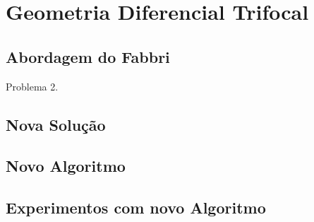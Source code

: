 \section{Geometria Diferencial Trifocal}\label{sec:geo:dif:tri}

\subsection{Abordagem do Fabbri}
Problema 2.

\subsection{Nova Solução}

\subsection{Novo Algoritmo}

\subsection{Experimentos com novo Algoritmo}


